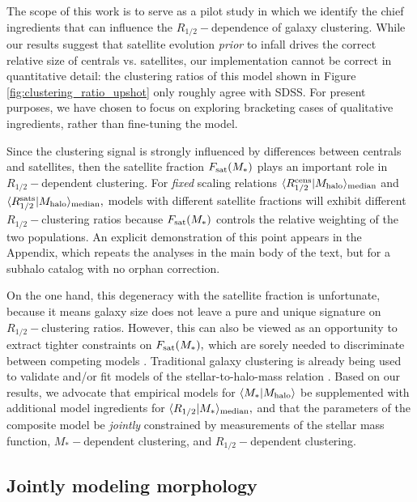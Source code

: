 \documentclass[usenatbib,usegraphicx,letterpaper]{mn2e}
\newcommand{\rhalf}{R_{1/2}}
\newcommand{\mstar}{M_{\ast}}
\newcommand{\mhalo}{M_{\rm halo}}
\newcommand{\mean}[2]{\langle{#1}\vert{#2}\rangle}
\newcommand{\median}[2]{\langle{#1}\vert{#2}\rangle_{\rm median}}
\begin{document}
The scope of this work is to serve as a pilot study in which we identify the chief ingredients that can influence the $\rhalf-$dependence of galaxy clustering. While our results suggest that satellite evolution {\em prior} to infall drives the correct relative size of centrals vs. satellites, our implementation cannot be correct in quantitative detail: the clustering ratios of this model shown in Figure \ref{fig:clustering_ratio_upshot} only roughly agree with SDSS. For present purposes, we have chosen to focus on exploring bracketing cases of qualitative ingredients, rather than fine-tuning the model.

Since the clustering signal is strongly influenced by differences between centrals and satellites, then the satellite fraction $F_{\rm sat}(\mstar)$ plays an important role in $\rhalf-$dependent clustering. For {\em fixed} scaling relations $\median{\rhalf^{\rm cens}}{\mhalo}$ and $\median{\rhalf^{\rm sats}}{\mhalo},$ models with different satellite fractions will exhibit different $\rhalf-$clustering ratios because $F_{\rm sat}(\mstar)$ controls the relative weighting of the two populations. An explicit demonstration of this point appears in the Appendix, which repeats the analyses in the main body of the text, but for a subhalo catalog with no orphan correction.

On the one hand, this degeneracy with the satellite fraction is unfortunate, because it means galaxy size does not leave a pure and unique signature on $\rhalf-$clustering ratios. However, this can also be viewed as an opportunity to extract tighter constraints on $F_{\rm sat}(\mstar),$ which are sorely needed to discriminate between competing models \citep{watson_conroy13}. Traditional galaxy clustering is already being used to validate and/or fit models of the stellar-to-halo-mass relation \citep[e.g.,][]{leauthaud_etal11,moster_etal13,behroozi13_smhm,lehmann_etal15}. Based on our results, we advocate that empirical models for $\mean{\mstar}{\mhalo}$ be supplemented with additional model ingredients for $\median{\rhalf}{\mstar},$ and that the parameters of the composite model be {\em jointly} constrained by measurements of the stellar mass function, $\mstar-$dependent clustering, and $\rhalf-$dependent clustering.

\subsection{Jointly modeling morphology}
\label{subsec:joint_morphology_modeling}
\end{document}
